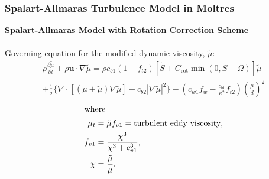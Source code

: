 \begin{frame}
  \frametitle{Spalart-Allmaras Turbulence Model in Moltres}
  \textbf{Spalart-Allmaras Model with Rotation Correction Scheme
  \cite{spalart_one-equation_1994, aupoix_extensions_2003, dacles-mariani_numericalexperimental_1995}}\\
  \\
  Governing equation for the modified dynamic viscosity, $\tilde{\mu}$:
  \begin{multline}
    \rho \frac{\partial\tilde{\mu}}{\partial t} + \rho \mathbf{u}\cdot\nabla\tilde{\mu} = \rho c_{b1}
    \left(1-f_{t2}\right)\left[\tilde{S}+C_\text{rot}\min(0,S-\Omega)\right]\tilde{\mu} \\ + \frac{1}{\sigma}\{\nabla\cdot\left[\left(\mu+
    \tilde{\mu}\right)\nabla\tilde{\mu}\right] + c_{b2}|\nabla\tilde{\mu}|^2\}
    - \left(c_{w1}f_w - \frac{c_{b1}}{\kappa^2}f_{t2}\right)\left(\frac{\tilde{\mu}}{d}\right)^2
  \end{multline}
  \begin{align*}
    \shortintertext{where}
      \mu_t &= \tilde{\mu}f_{v1} = \text{turbulent eddy viscosity}, \\
      f_{v1} &= \frac{\chi^3}{\chi^3 + c_{v1}^3}, \\
      \chi &= \frac{\tilde{\mu}}{\mu}.
  \end{align*}
\end{frame}

